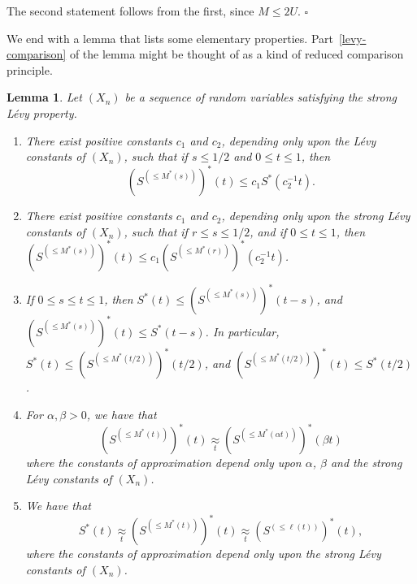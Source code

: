 \documentclass[12pt]{article}
\newtheorem{lemma}[thm]{Lemma}
\newcommand{\approxsb}[1]{\mathrel{\mathop{\approx}\limits_{#1}}}
\newcommand{\qed}{\leavevmode\unskip\penalty9999
                  \hbox{}\nobreak\hfill$\square$\goodbreak\medskip}
\begin{document}
The second statement follows from the first, since $M
\le 2 U$. 
\qed

We end with a lemma that lists some elementary properties.  
Part~\ref{levy-comparison}
of the lemma might be thought of as a kind of reduced 
comparison principle.

\begin{lemma}
\label{levy}
Let $(X_n)$ be a sequence of random variables 
satisfying the strong L\'evy property. 
\begin{enumerate}
\item 
\label{levy-comparison}
There exist  positive constants $c_1$ and $c_2$, depending
only upon the L\'evy constants of $(X_n)$, such that if $s \le 1/2$
and 
$0 \le t \le 1$, then $$ (S^{(\le M^*(s))})^*(t) \le c_1
S^*(c_2^{-1} t) .$$ 
\item 
\label{levy-incsuper}
There exist positive constants $c_1$
and $c_2$, depending only upon the 
strong L\'evy constants of $(X_n)$, such that if $r \le s \le 1/2$,
and if $0 \le t \le 1$, then
$(S^{(\le M^*(s))})^*(t) \le c_1 (S^{(\le M^*(r))})^*(c_2^{-1}t)$.
\item 
\label{levy-decsuper}
If $0 \le s \le t \le 1$, then $S^*(t) \le (S^{(\le 
M^*(s))})^*(t-s)$, and
 $(S^{(\le M^*(s))})^*(t) \le S^
*(t-s)$. In particular, $S^*(t) \le (S^{(\le 
M^*(t/2))})^*(t/2)$, and $(S^{(\le 
M^*(t/2))})^*(t) \le S^*(t/2)$. 
\item 
\label{levy-equiv}
For $\alpha,\beta > 0$, we have
that 
$$ (S^{(\le M^*(t))})^*(t)
\approxsb t (S^{(\le M^*(\alpha t))})^*(\beta t) $$
where the 
constants of approximation depend only upon $\alpha$, $\beta$ and the strong
L\'evy constants of $(X_n)$. 
\item 
\label{levy-ellequiv}
We have that $$ S^*(t) \approxsb t (S^{(\le M^*(t))})^*(t) \approxsb t
(S^{(\le \ell(t))})^*(t) ,$$ where 
the constants of approximation depend only upon the strong L\'evy
constants of $(X_n)$.
\end{enumerate}
\end{lemma}
\end{document}

